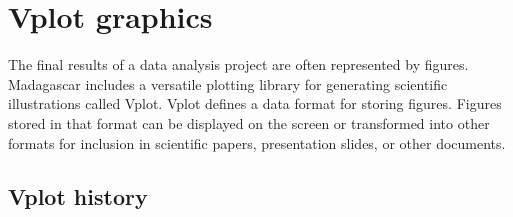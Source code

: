\chapter{Vplot graphics}

The final results of a data analysis project are often represented by figures. Madagascar includes a versatile plotting library for generating scientific illustrations called Vplot. Vplot defines a data format for storing figures. Figures stored in that format can be displayed on the screen or transformed into other formats for inclusion in scientific papers, presentation slides, or other documents.

\section{Vplot history}

